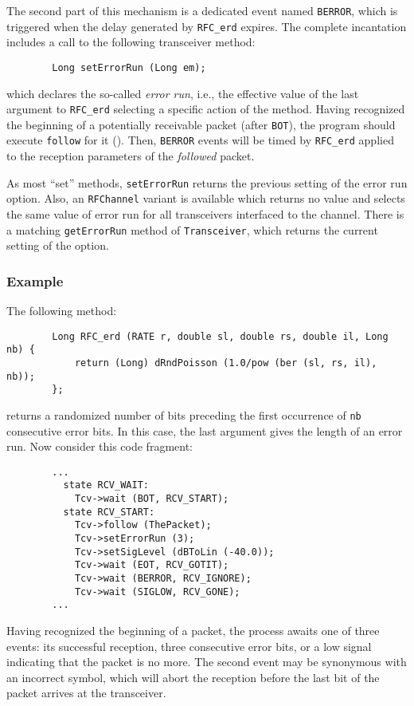 The second part of this mechanism is a dedicated event named {\tt BERROR},
which is triggered when the delay generated by {\tt RFC\_erd} expires.
The complete incantation includes a call to the following transceiver
method:
\begin{verbatim}
        Long setErrorRun (Long em);
\end{verbatim}
\noindent
which declares the so-called {\em error run}, i.e.,
the effective value of the last argument to {\tt RFC\_erd}
selecting a specific action of the method.
Having recognized the beginning of a potentially receivable packet (after
{\tt BOT}), the program should execute {\tt follow} for it
().
Then, {\tt BERROR} events will be timed by {\tt RFC\_erd} applied to the
reception parameters of the {\em followed\/} packet.

As most ``set'' methods, {\tt setErrorRun} returns the previous setting of
the error run option.
Also, an {\tt RFChannel} variant is available which returns no value and
selects the same value of error run
for all transceivers interfaced to the channel.
There is a matching {\tt getErrorRun} method of {\tt Transceiver}, which
returns the current setting of the option.

\subsubsection*{Example}

The following method:

\begin{verbatim}
        Long RFC_erd (RATE r, double sl, double rs, double il, Long nb) {
            return (Long) dRndPoisson (1.0/pow (ber (sl, rs, il), nb));
        };
\end{verbatim}
returns a randomized number of bits preceding the first occurrence of {\tt nb}
consecutive error bits.
In this case, the last argument gives the length of an error run.
Now consider this code fragment:

\begin{verbatim}
        ...
          state RCV_WAIT:
            Tcv->wait (BOT, RCV_START);
          state RCV_START:
            Tcv->follow (ThePacket);
            Tcv->setErrorRun (3);
            Tcv->setSigLevel (dBToLin (-40.0));
            Tcv->wait (EOT, RCV_GOTIT);
            Tcv->wait (BERROR, RCV_IGNORE);
            Tcv->wait (SIGLOW, RCV_GONE);
        ...
\end{verbatim}

Having recognized the beginning of a packet, the process awaits one of three
events: its successful reception, three consecutive error bits, or a low
signal indicating that the packet is no more.
The second event may be synonymous with an incorrect symbol, which will
abort the reception before the last bit of the packet arrives at the
transceiver.

